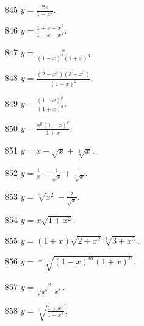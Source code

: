 
\begin{prob}[S]{845}
$y = \frac{2x}{1 - x^2}$.
\end{prob}

\begin{prob}[S]{846}
$y = \frac{1 + x - x^2}{1 - x + x^2}$.
\end{prob}

\begin{prob}[S]{847}
$y = \frac{x}{(1 - x)^2(1 + x)^3}$.
\end{prob}

\begin{prob}[S]{848}
$y = \frac{(2 - x^2)(3 - x^3)}{(1 - x)^2}$.
\end{prob}

\begin{prob}[S]{849}
$y = \frac{(1 - x)^p}{(1 + x)^q}$.
\end{prob}

\begin{prob}[S]{850}
$y = \frac{x^p(1 - x)^q}{1 + x}$.
\end{prob}

\begin{prob}[S]{851}
$y = x + \sqrt{x} + \sqrt[3]{x}$.
\end{prob}

\begin{prob}[S]{852}
$y = \frac{1}{x} + \frac{1}{\sqrt{x}} + \frac{1}{\sqrt[3]{x}}$.
\end{prob}

\begin{prob}[S]{853}
$y = \sqrt[3]{x^2} - \frac{2}{\sqrt{x}}$.
\end{prob}

\begin{prob}[S]{854}
$y = x\sqrt{1 + x^2}$.
\end{prob}

\begin{prob}[S]{855}
$y = (1 + x)\sqrt{2 + x^2}\sqrt[3]{3 + x^3}$.
\end{prob}

\begin{prob}[S]{856}
$y = \sqrt[m+n]{(1 - x)^m(1 + x)^n}$.
\end{prob}

\begin{prob}[S]{857}
$y = \frac{x}{\sqrt{a^2 - x^2}}$.
\end{prob}

\begin{prob}[S]{858}
$y = \sqrt[3]{\frac{1 + x^3}{1 - x^3}}$.
\end{prob}

